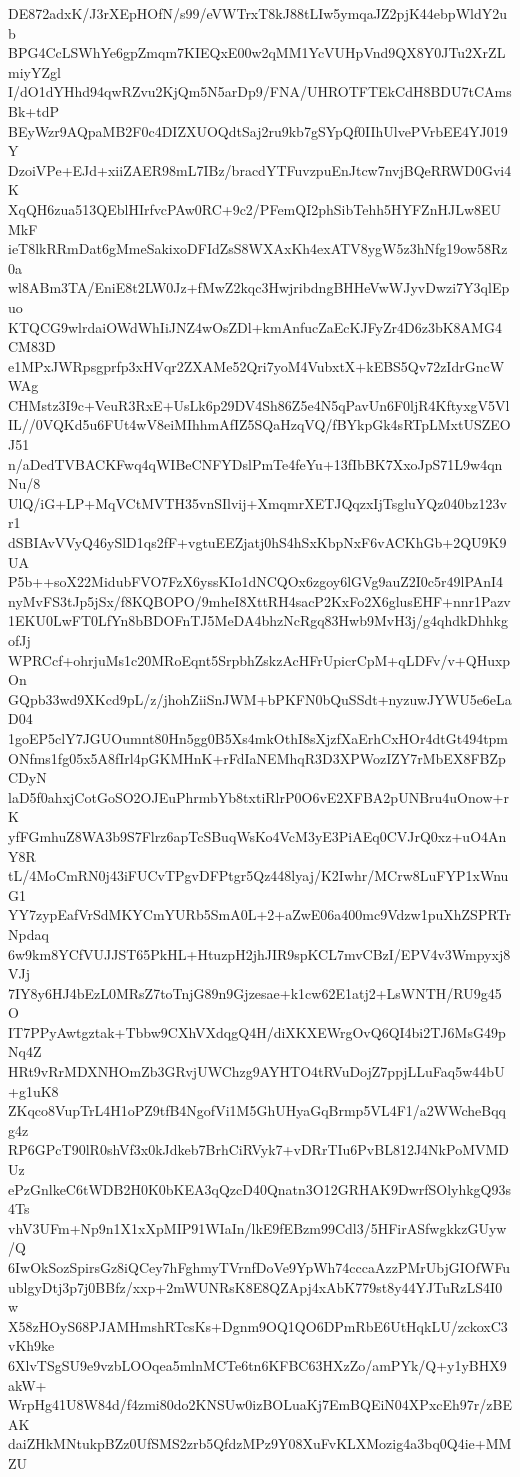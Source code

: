 DE872adxK/J3rXEpHOfN/s99/eVWTrxT8kJ88tLIw5ymqaJZ2pjK44ebpWldY2ub
BPG4CcLSWhYe6gpZmqm7KIEQxE00w2qMM1YcVUHpVnd9QX8Y0JTu2XrZLmiyYZgl
I/dO1dYHhd94qwRZvu2KjQm5N5arDp9/FNA/UHROTFTEkCdH8BDU7tCAmsBk+tdP
BEyWzr9AQpaMB2F0c4DIZXUOQdtSaj2ru9kb7gSYpQf0IIhUlvePVrbEE4YJ019Y
DzoiVPe+EJd+xiiZAER98mL7IBz/bracdYTFuvzpuEnJtcw7nvjBQeRRWD0Gvi4K
XqQH6zua513QEblHIrfvcPAw0RC+9c2/PFemQI2phSibTehh5HYFZnHJLw8EUMkF
ieT8lkRRmDat6gMmeSakixoDFIdZsS8WXAxKh4exATV8ygW5z3hNfg19ow58Rz0a
wl8ABm3TA/EniE8t2LW0Jz+fMwZ2kqc3HwjribdngBHHeVwWJyvDwzi7Y3qlEpuo
KTQCG9wlrdaiOWdWhIiJNZ4wOsZDl+kmAnfucZaEcKJFyZr4D6z3bK8AMG4CM83D
e1MPxJWRpsgprfp3xHVqr2ZXAMe52Qri7yoM4VubxtX+kEBS5Qv72zIdrGncWWAg
CHMstz3I9c+VeuR3RxE+UsLk6p29DV4Sh86Z5e4N5qPavUn6F0ljR4KftyxgV5Vl
IL//0VQKd5u6FUt4wV8eiMIhhmAfIZ5SQaHzqVQ/fBYkpGk4sRTpLMxtUSZEOJ51
n/aDedTVBACKFwq4qWIBeCNFYDslPmTe4feYu+13fIbBK7XxoJpS71L9w4qnNu/8
UlQ/iG+LP+MqVCtMVTH35vnSIlvij+XmqmrXETJQqzxIjTsgluYQz040bz123vr1
dSBIAvVVyQ46ySlD1qs2fF+vgtuEEZjatj0hS4hSxKbpNxF6vACKhGb+2QU9K9UA
P5b++soX22MidubFVO7FzX6yssKIo1dNCQOx6zgoy6lGVg9auZ2I0c5r49lPAnI4
nyMvFS3tJp5jSx/f8KQBOPO/9mheI8XttRH4sacP2KxFo2X6glusEHF+nnr1Pazv
1EKU0LwFT0LfYn8bBDOFnTJ5MeDA4bhzNcRgq83Hwb9MvH3j/g4qhdkDhhkgofJj
WPRCcf+ohrjuMs1c20MRoEqnt5SrpbhZskzAcHFrUpicrCpM+qLDFv/v+QHuxpOn
GQpb33wd9XKcd9pL/z/jhohZiiSnJWM+bPKFN0bQuSSdt+nyzuwJYWU5e6eLaD04
1goEP5clY7JGUOumnt80Hn5gg0B5Xs4mkOthI8sXjzfXaErhCxHOr4dtGt494tpm
ONfms1fg05x5A8fIrl4pGKMHnK+rFdIaNEMhqR3D3XPWozIZY7rMbEX8FBZpCDyN
laD5f0ahxjCotGoSO2OJEuPhrmbYb8txtiRlrP0O6vE2XFBA2pUNBru4uOnow+rK
yfFGmhuZ8WA3b9S7Flrz6apTcSBuqWsKo4VcM3yE3PiAEq0CVJrQ0xz+uO4AnY8R
tL/4MoCmRN0j43iFUCvTPgvDFPtgr5Qz448lyaj/K2Iwhr/MCrw8LuFYP1xWnuG1
YY7zypEafVrSdMKYCmYURb5SmA0L+2+aZwE06a400mc9Vdzw1puXhZSPRTrNpdaq
6w9km8YCfVUJJST65PkHL+HtuzpH2jhJIR9spKCL7mvCBzI/EPV4v3Wmpyxj8VJj
7IY8y6HJ4bEzL0MRsZ7toTnjG89n9Gjzesae+k1cw62E1atj2+LsWNTH/RU9g45O
IT7PPyAwtgztak+Tbbw9CXhVXdqgQ4H/diXKXEWrgOvQ6QI4bi2TJ6MsG49pNq4Z
HRt9vRrMDXNHOmZb3GRvjUWChzg9AYHTO4tRVuDojZ7ppjLLuFaq5w44bU+g1uK8
ZKqco8VupTrL4H1oPZ9tfB4NgofVi1M5GhUHyaGqBrmp5VL4F1/a2WWcheBqqg4z
RP6GPcT90lR0shVf3x0kJdkeb7BrhCiRVyk7+vDRrTIu6PvBL812J4NkPoMVMDUz
ePzGnlkeC6tWDB2H0K0bKEA3qQzcD40Qnatn3O12GRHAK9DwrfSOlyhkgQ93s4Ts
vhV3UFm+Np9n1X1xXpMIP91WIaIn/lkE9fEBzm99Cdl3/5HFirASfwgkkzGUyw/Q
6IwOkSozSpirsGz8iQCey7hFghmyTVrnfDoVe9YpWh74cccaAzzPMrUbjGIOfWFu
ublgyDtj3p7j0BBfz/xxp+2mWUNRsK8E8QZApj4xAbK779st8y44YJTuRzLS4I0w
X58zHOyS68PJAMHmshRTcsKs+Dgnm9OQ1QO6DPmRbE6UtHqkLU/zckoxC3vKh9ke
6XlvTSgSU9e9vzbLOOqea5mlnMCTe6tn6KFBC63HXzZo/amPYk/Q+y1yBHX9akW+
WrpHg41U8W84d/f4zmi80do2KNSUw0izBOLuaKj7EmBQEiN04XPxcEh97r/zBEAK
daiZHkMNtukpBZz0UfSMS2zrb5QfdzMPz9Y08XuFvKLXMozig4a3bq0Q4ie+MMZU
